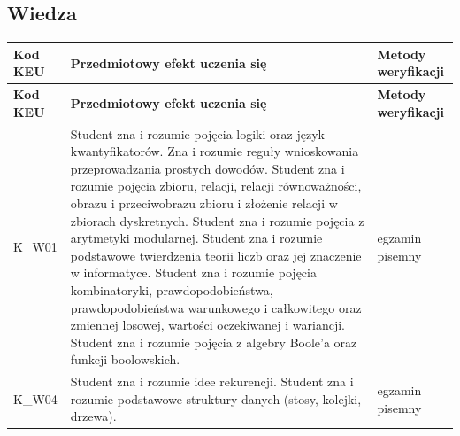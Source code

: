 \documentclass[12pt, a4paper]{article}
\newcommand{\thdrule}{\noalign{\global\setlength{\extrarowheight}{0pt}}}
\newcommand{\thdend}{\noalign{\global\setlength{\extrarowheight}{3pt}}}
\begin{document}
\subsection*{Wiedza}
{\scriptsize
\begin{longtable}{m{1.6cm}m{9.0cm}m{4.2cm}}
\thdrule\toprule
\rowcolor{pjatkRed} {\color{white}\footnotesize\textbf{\vphantom{Ag}Kod KEU}} & {\color{white}\footnotesize\textbf{\vphantom{Ag}Przedmiotowy efekt uczenia się}} & {\color{white}\footnotesize\textbf{\vphantom{Ag}Metody weryfikacji}} \\
\midrule\thdend
\endfirsthead
\thdrule\toprule
\rowcolor{pjatkRed} {\color{white}\footnotesize\textbf{\vphantom{Ag}Kod KEU}} & {\color{white}\footnotesize\textbf{\vphantom{Ag}Przedmiotowy efekt uczenia się}} & {\color{white}\footnotesize\textbf{\vphantom{Ag}Metody weryfikacji}} \\
\midrule\thdend
\endhead
  \rowcolor{tableRowLight} K\_W01 & Student zna i rozumie pojęcia logiki oraz język kwantyfikatorów. Zna i rozumie reguły wnioskowania przeprowadzania prostych dowodów. Student zna i rozumie  pojęcia zbioru, relacji, relacji równoważności, obrazu i przeciwobrazu zbioru i złożenie relacji w zbiorach dyskretnych. Student zna i rozumie pojęcia z arytmetyki modularnej. Student zna i rozumie podstawowe twierdzenia teorii liczb oraz jej znaczenie w informatyce. Student zna i rozumie  pojęcia kombinatoryki, prawdopodobieństwa, prawdopodobieństwa warunkowego i całkowitego oraz zmiennej losowej, wartości oczekiwanej i wariancji. Student zna i rozumie  pojęcia z algebry Boole’a oraz funkcji boolowskich. & egzamin pisemny \\
  \rowcolor{tableRowAlt} K\_W04 & Student zna i rozumie idee rekurencji. Student zna i rozumie podstawowe struktury danych (stosy, kolejki, drzewa). & egzamin pisemny \\
\bottomrule
\end{longtable}}
\end{document}
